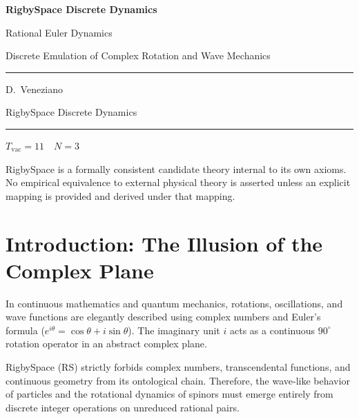 \documentclass[11pt, letterpaper]{article}
\newcommand{\Tvac}{T_{\mathrm{vac}}}
\begin{document}
\begin{titlepage}
  \centering
  \vspace*{2cm}
  {\Huge\bfseries\color{RSblue} RigbySpace Discrete Dynamics\par}
  \vspace{0.5cm}
  {\LARGE Rational Euler Dynamics\par}
  \vspace{0.5cm}
  {\large Discrete Emulation of Complex Rotation and Wave Mechanics\par}
  \vspace{2cm}
  \rule{0.6\textwidth}{0.4pt}\par
  \vspace{1cm}
  {\large D.\ Veneziano\par}
  \vspace{0.8cm}
  {\normalsize RigbySpace Discrete Dynamics\par}
  \vspace{1.5cm}
  \rule{0.6\textwidth}{0.4pt}\par
  \vspace{0.5cm}
  {\small $\Tvac = 11 \quad N = 3$ \par}
  \vfill
  {\small\color{RSgray}
  RigbySpace is a formally consistent candidate theory internal to its own
  axioms. No empirical equivalence to external physical theory is asserted
  unless an explicit mapping is provided and derived under that mapping.\par}
\end{titlepage}

\tableofcontents
\newpage

\section{Introduction: The Illusion of the Complex Plane}

In continuous mathematics and quantum mechanics, rotations, oscillations, and wave functions are elegantly described using complex numbers and Euler's formula ($e^{i\theta} = \cos\theta + i\sin\theta$). The imaginary unit $i$ acts as a continuous $90^\circ$ rotation operator in an abstract complex plane.

RigbySpace (RS) strictly forbids complex numbers, transcendental functions, and continuous geometry from its ontological chain. Therefore, the wave-like behavior of particles and the rotational dynamics of spinors must emerge entirely from discrete integer operations on unreduced rational pairs.
\end{document}
